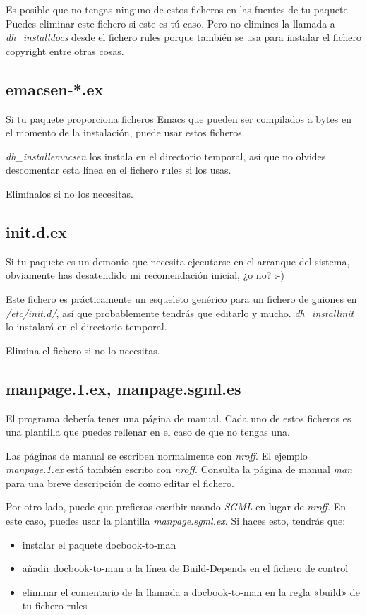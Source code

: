 \documentclass[letterpaper,12pt,spanish]{manual}
\begin{document}
Es posible que no tengas ninguno de estos ficheros en las fuentes de tu paquete. Puedes eliminar este fichero si este es tú caso. Pero no elimines la llamada a \emph{dh\_installdocs} desde el fichero rules porque también se usa para instalar el fichero copyright entre otras cosas.


\subsection{emacsen-*.ex}

Si tu paquete proporciona ficheros Emacs que pueden ser compilados a bytes en el momento de la instalación, puede usar estos ficheros.

\emph{dh\_installemacsen} los instala en el directorio temporal, así que no olvides descomentar esta línea en el fichero rules si los usas.

Elimínalos si no los necesitas.


\subsection{init.d.ex}

Si tu paquete es un demonio que necesita ejecutarse en el arranque del sistema, obviamente has desatendido mi recomendación inicial, ¿o no? :-)

Este fichero es prácticamente un esqueleto genérico para un fichero de guiones en \emph{/etc/init.d/}, así que probablemente tendrás que editarlo y mucho. \emph{dh\_installinit} lo instalará en el directorio temporal.

Elimina el fichero si no lo necesitas.


\subsection{manpage.1.ex, manpage.sgml.es}

El programa debería tener una página de manual. Cada uno de estos ficheros es una plantilla que puedes rellenar en el caso de que no tengas una.

Las páginas de manual se escriben normalmente con \emph{nroff}. El ejemplo \emph{manpage.1.ex} está también escrito con \emph{nroff}. Consulta la página de manual \emph{man} para una breve descripción de como editar el fichero.

Por otro lado, puede que prefieras escribir usando \emph{SGML} en lugar de \emph{nroff}. En este caso, puedes usar la plantilla \emph{manpage.sgml.ex}. Si haces esto, tendrás que:
\begin{itemize}
\item {} 
instalar el paquete docbook-to-man

\item {} 
añadir docbook-to-man a la línea de Build-Depends en el fichero de control

\item {} 
eliminar el comentario de la llamada a docbook-to-man en la regla «build» de tu fichero rules

\end{itemize}
\end{document}
